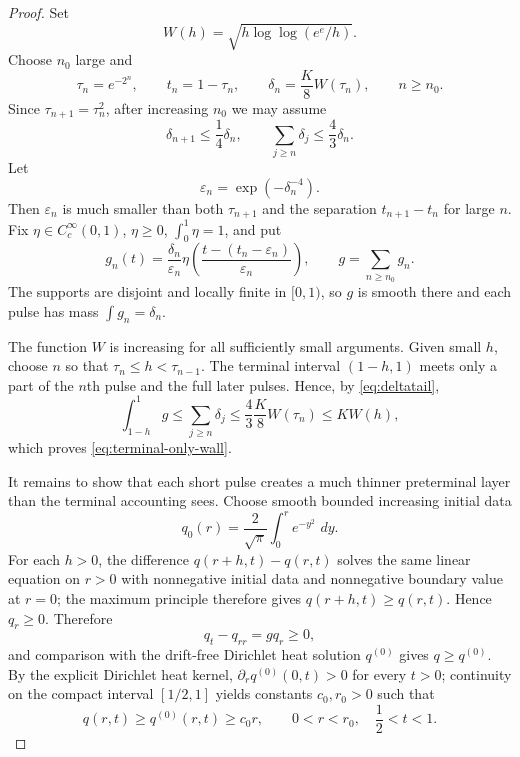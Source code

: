 \documentclass[10pt,a4paper]{amsart}
\newcommand{\dd}{\,d}
\begin{document}
\begin{proof}
Set
\[
 W(h)=\sqrt{h\log\log(e^e/h)}.
\]
Choose $n_0$ large and
\[
 \tau_n=e^{-2^n},\qquad t_n=1-\tau_n,\qquad
 \delta_n=\frac K8 W(\tau_n),\qquad n\ge n_0.
\]
Since $\tau_{n+1}=\tau_n^2$, after increasing $n_0$ we may assume
\begin{equation}\label{eq:deltatail}
 \delta_{n+1}\le\frac14\delta_n,
 \qquad
 \sum_{j\ge n}\delta_j\le\frac43\delta_n.
\end{equation}
Let
\[
 \varepsilon_n=\exp(-\delta_n^{-4}).
\]
Then $\varepsilon_n$ is much smaller than both $\tau_{n+1}$ and the separation $t_{n+1}-t_n$ for large $n$.  Fix $\eta\in C_c^\infty(0,1)$, $\eta\ge0$, $\int_0^1\eta=1$, and put
\[
 g_n(t)=\frac{\delta_n}{\varepsilon_n}
 \eta\!\left(\frac{t-(t_n-\varepsilon_n)}{\varepsilon_n}\right),
 \qquad
 g=\sum_{n\ge n_0}g_n.
\]
The supports are disjoint and locally finite in $[0,1)$, so $g$ is smooth there and each pulse has mass $\int g_n=\delta_n$.

The function $W$ is increasing for all sufficiently small arguments.  Given small $h$, choose $n$ so that $\tau_n\le h<\tau_{n-1}$.  The terminal interval $(1-h,1)$ meets only a part of the $n$th pulse and the full later pulses.  Hence, by \eqref{eq:deltatail},
\[
 \int_{1-h}^1g
 \le\sum_{j\ge n}\delta_j
 \le\frac43\frac K8W(\tau_n)
 \le K W(h),
\]
which proves \eqref{eq:terminal-only-wall}.

It remains to show that each short pulse creates a much thinner preterminal layer than the terminal accounting sees.  Choose smooth bounded increasing initial data
\[
 q_0(r)=\frac{2}{\sqrt\pi}\int_0^r e^{-y^2}\,\dd y.
\]
For each $h>0$, the difference $q(r+h,t)-q(r,t)$ solves the same linear equation on $r>0$ with nonnegative initial data and nonnegative boundary value at $r=0$; the maximum principle therefore gives $q(r+h,t)\ge q(r,t)$.  Hence $q_r\ge0$.  Therefore
\[
 q_t-q_{rr}=gq_r\ge0,
\]
and comparison with the drift-free Dirichlet heat solution $q^{(0)}$ gives $q\ge q^{(0)}$.  By the explicit Dirichlet heat kernel, $\partial_rq^{(0)}(0,t)>0$ for every $t>0$; continuity on the compact interval $[1/2,1]$ yields constants $c_0,r_0>0$ such that
\begin{equation}\label{eq:baseline-linear}
 q(r,t)\ge q^{(0)}(r,t)\ge c_0r,
 \qquad 0<r<r_0,\quad \frac12<t<1.
\end{equation}


\end{proof}
\end{document}
